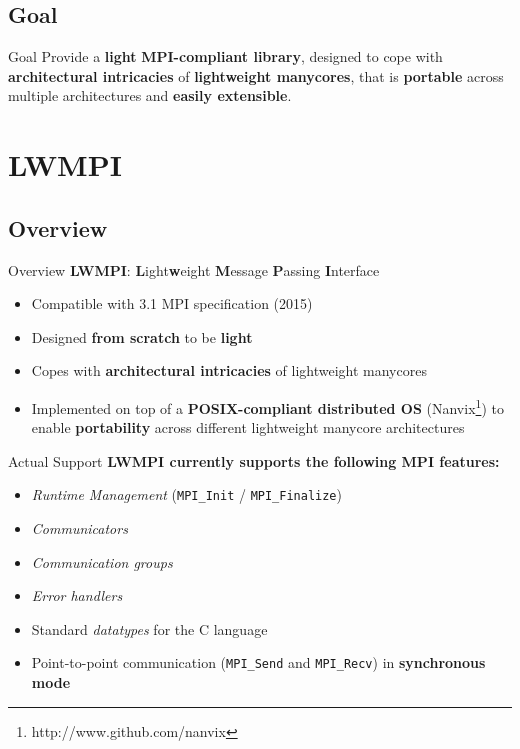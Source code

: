 \documentclass[english,aspectratio=169]{lapesd-slides}
\begin{document}
    \subsection{Goal}
      \begin{frame}{Goal}
          Provide a \textbf{light} \textbf{MPI-compliant library}, designed to cope with \textbf{architectural intricacies}
          of \textbf{lightweight manycores}, that is \textbf{portable} across multiple architectures and \textbf{easily extensible}.
      \end{frame}


  \section{LWMPI}

    \subsection{Overview}
      \begin{frame}{Overview}
	\textbf{LWMPI}: \textbf{L}ight\textbf{w}eight \textbf{M}essage \textbf{P}assing \textbf{I}nterface
        \begin{itemize}
          \item Compatible with 3.1 MPI specification (2015)
          \item Designed \textbf{from scratch} to be \textbf{light}
          \item Copes with \textbf{architectural intricacies} of lightweight manycores
          \item Implemented on top of a \textbf{POSIX-compliant distributed OS} (Nanvix\footnote[frame]{\scriptsize http://www.github.com/nanvix}) to enable \textbf{portability} across different lightweight manycore architectures~\cite{Penna2019-3}
        \end{itemize}
      \end{frame}

      \begin{frame}{Actual Support}
       \textbf{LWMPI currently supports the following MPI features:}

        \begin{itemize}
          \item \textit{Runtime Management} (\texttt{MPI\_Init} / \texttt{MPI\_Finalize})
          \item \textit{Communicators}
          \item \textit{Communication groups}
          \item \textit{Error handlers}
          \item Standard \textit{datatypes} for the C language
          \item Point-to-point communication (\texttt{MPI\_Send} and \texttt{MPI\_Recv})
            in \textbf{synchronous mode} 
        \end{itemize}
      \end{frame}
\end{document}
